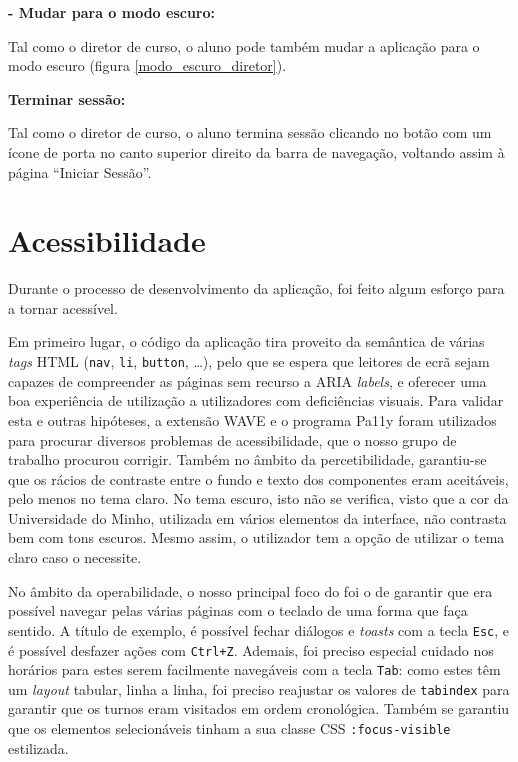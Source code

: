 \documentclass[12pt, a4paper]{article}
\begin{document}
\textbf{- Mudar para o modo escuro:}

Tal como o diretor de curso, o aluno pode também mudar a aplicação para o modo escuro (figura
\ref{modo_escuro_diretor}).

\textbf{Terminar sessão:}

Tal como o diretor de curso, o aluno termina sessão clicando no botão com um ícone de porta no
canto superior direito da barra de navegação, voltando assim à página ``Iniciar Sessão''.

\section{Acessibilidade}

Durante o processo de desenvolvimento da aplicação, foi feito algum esforço para a tornar acessível.

Em primeiro lugar, o código da aplicação tira proveito da semântica de várias \emph{tags} HTML
(\texttt{nav}, \texttt{li}, \texttt{button}, \ldots), pelo que se espera que leitores de ecrã sejam
capazes de compreender as páginas sem recurso a ARIA \emph{labels}, e oferecer uma boa experiência
de utilização a utilizadores com deficiências visuais. Para validar esta e outras hipóteses, a
extensão WAVE \cite{wave} e o programa Pa11y \cite{pa11y} foram utilizados para procurar diversos
problemas de acessibilidade, que o nosso grupo de trabalho procurou corrigir. Também no âmbito da
percetibilidade, garantiu-se que os rácios de contraste entre o fundo e texto dos componentes eram
aceitáveis, pelo menos no tema claro. No tema escuro, isto não se verifica, visto que a cor da
Universidade do Minho, utilizada em vários elementos da interface, não contrasta bem com tons
escuros. Mesmo assim, o utilizador tem a opção de utilizar o tema claro caso o necessite.

No âmbito da operabilidade, o nosso principal foco do foi o de garantir que era possível navegar
pelas várias páginas com o teclado de uma forma que faça sentido. A título de exemplo, é possível
fechar diálogos e \emph{toasts} com a tecla \texttt{Esc}, e é possível desfazer ações com
\texttt{Ctrl+Z}. Ademais, foi preciso especial cuidado nos horários para estes serem facilmente
navegáveis com a tecla \texttt{Tab}: como estes têm um \emph{layout} tabular, linha a linha, foi
preciso reajustar os valores de \texttt{tabindex} para garantir que os turnos eram visitados em
ordem cronológica. Também se garantiu que os elementos selecionáveis tinham a sua classe CSS
\texttt{:focus-visible} estilizada.
\end{document}
